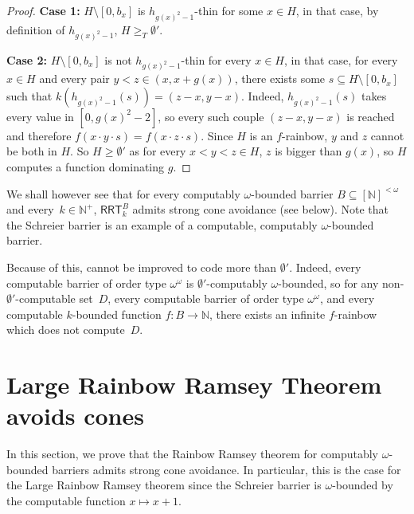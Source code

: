 \documentclass{article}
\newcommand{\RRT}[0]{\mathsf{RRT}}
\newcommand{\NN}[0]{\mathbb{N}}
\numberwithin{theorem}{section}
\newcommand{\ludovic}[1]{\textcolor{blue}{#1}}
\begin{document}
\begin{proof}
\textbf{Case 1:} $H \setminus [0,b_x]$ is $h_{g(x)^2 - 1}$-thin for some $x \in H$, in that case, by definition of $h_{g(x)^2 - 1}$, $H \geq_T \emptyset'$.

\textbf{Case 2:} $H \setminus [0,b_x]$ is not $h_{g(x)^2 - 1}$-thin for every $x \in H$, in that case, for every $x \in H$ and every pair $y < z \in (x, x + g(x))$, there exists some $s \subseteq H \setminus [0,b_x]$ such that $k(h_{g(x)^2 - 1}(s)) = (z - x,y - x)$. Indeed, $h_{g(x)^2 - 1}(s)$ takes every value in $[0, g(x)^2 - 2]$, so every such couple $(z - x,y - x)$ is reached and therefore $f(x \cdot y \cdot s) = f(x \cdot z \cdot s)$. Since $H$ is an $f$-rainbow, $y$ and $z$ cannot be both in $H$. So $H \geq \emptyset'$ as for every $x < y < z \in H$, $z$ is bigger than $g(x)$, so $H$ computes a function dominating $g$.

\end{proof}

We shall however see that for every computably $\omega$-bounded barrier $B \subseteq [\NN]^{<\omega}$ and every~$k \in \NN^+$, $\RRT^B_k$ admits strong cone avoidance (see below). Note that the Schreier barrier is an example of a computable, computably $\omega$-bounded barrier.

Because of this,  cannot be improved to code more than $\emptyset'$. Indeed, every computable barrier of order type $\omega^\omega$ is $\emptyset'$-computably $\omega$-bounded, so for any non-$\emptyset'$-computable set~$D$, every computable barrier of order type $\omega^\omega$, and every computable $k$-bounded function $f : B \to \NN$, there exists an infinite $f$-rainbow which does not compute~$D$.

\section{Large Rainbow Ramsey Theorem avoids cones}\label{sec:cone_avoid}

In this section, we prove that the Rainbow Ramsey theorem for computably $\omega$-bounded barriers admits strong cone avoidance. In particular, this is the case for the Large Rainbow Ramsey theorem since the Schreier barrier is $\omega$-bounded by the computable function $x \mapsto x + 1$.
\end{document}
